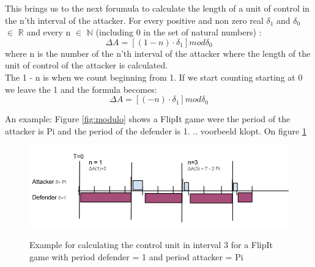 This brings us to the next forumula to calculate the length of a unit of control in the n'th interval of the attacker. 
For every positive and non zero real $\delta_{1}$ and $\delta_{0}$ $\in$ \(\mathbb{R}\) and every n $\in$ \(\mathbb{N}\) (including 0 in the set of natural numbers) :
\begin{equation}\label{first}
\Delta A = [( 1- n  ) \cdot \delta_{1}] mod \delta_{0}
\end{equation}
where n is the number of the n'th interval of the attacker where the length of the unit of control of the attacker is calculated.\\

The 1 - n is when we count beginning from 1. If we start counting starting at 0 we leave the 1 and the formula becomes:
\begin{equation}\label{first}
\Delta A = [( - n  ) \cdot \delta_{1}] mod \delta_{0}
\end{equation}

An example: Figure \ref{fig:modulo} shows a FlipIt game were the period of the attacker is Pi and the period of the defender is 1. .. voorbeeld klopt.
On figure \ref{fig:unitofcontrolformula} 
\begin{figure}[hbtp]
\caption{Example for calculating the control unit in interval 3 for a FlipIt game with period defender = 1 and period attacker = Pi}
\centering
\includegraphics[scale=0.6]{Images/VoorbeeldUnit.png}
\label{fig:unitofcontrolformula}
\end{figure}


